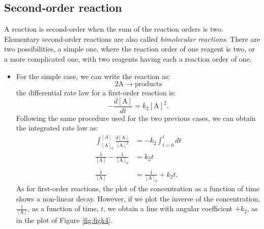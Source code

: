 \documentclass[
  9pt,
]{extbook}
\providecommand{\tightlist}{%
  \setlength{\itemsep}{0pt}\setlength{\parskip}{0pt}}
\theoremstyle{definition}
\theoremstyle{definition}
\theoremstyle{definition}
\theoremstyle{remark}
\begin{document}
\hypertarget{second-order-reaction}{%
\subsection{Second-order reaction}\label{second-order-reaction}}

A reaction is second-order when the sum of the reaction orders is two. Elementary second-order reactions are also called \emph{bimolecular reactions}. There are two possibilities, a simple one, where the reaction order of one reagent is two, or a more complicated one, with two reagents having each a reaction order of one.

\begin{itemize}
\tightlist
\item
  For the simple case, we can write the reaction as:
  \begin{equation}
  2\mathrm{A}\rightarrow \text{products}
  \end{equation}
  the differential rate law for a first-order reaction is:
  \begin{equation}
  -\frac{d[\mathrm{A}]}{dt}=k_2 [\mathrm{A}]^2.
  \label{eq:kin10}
  \end{equation}
  Following the same procedure used for the two previous cases, we can obtain the integrated rate law as:
  \begin{equation}
  \begin{aligned}
  \int_{[\mathrm{A}]_0}^{[A]} \frac{d[\mathrm{A}]}{[\mathrm{A}]^2} &= -k_2 \int_{t=0}^{t} dt \\
  \frac{1}{[\mathrm{A}]}-\frac{1}{[\mathrm{A}]_0} &= k_2 t\\ \\
  \frac{1}{[\mathrm{A}]}&=\frac{1}{[\mathrm{A}]_0} + k_2 t.
  \end{aligned}
  \label{eq:kin11}
  \end{equation}
  As for first-order reactions, the plot of the concentration as a function of time shows a non-linear decay. However, if we plot the inverse of the concentration, \(\frac{1}{[\mathrm{A}]}\), as a function of time, \(t\), we obtain a line with angular coefficient \(+k_2\), as in the plot of Figure \ref{fig:figk4}.
\end{itemize}
\end{document}
